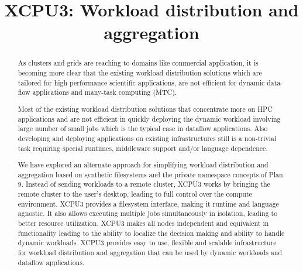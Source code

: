 \documentclass[conference]{IEEEtran}
\begin{document}
\title{XCPU3: Workload distribution and aggregation}


\author{
\and
{}
}

\maketitle

\begin{abstract}


As clusters and grids are reaching to domains like commercial application, it
is becoming more clear that the existing workload distribution solutions which
are tailored for high performance scientific applications, are not efficient
for dynamic data-flow applications and many-task computing (MTC).

Most of the existing workload distribution solutions that concentrate more on
HPC applications and are not efficient in quickly deploying the dynamic
workload involving large number of small jobs which is the typical case in
dataflow applications. Also developing and deploying applications on existing
infrastructures still is a non-trivial task requiring special runtimes,
middleware support and/or language dependence.

We have explored an alternate approach for simplifying workload
distribution and aggregation based on synthetic filesystems and the private
namespace concepts of Plan 9.  Instead of sending workloads to a remote
cluster, XCPU3 works by bringing the remote cluster to the user's desktop,
leading to full control over the compute environment.   XCPU3 provides
a filesystem interface, making it runtime and language agnostic.  It also
allows executing multiple jobs simultaneously in isolation, leading to
better resource utilization.  XCPU3 makes all nodes independent and
equivalent in functionality leading to the ability to localize the
decision making and ability to handle dynamic workloads.  XCPU3 provides easy to
use, flexible and scalable infrastructure for workload distribution and
aggregation that can be used by dynamic workloads and dataflow applications.
 
\end{abstract}
\end{document}
